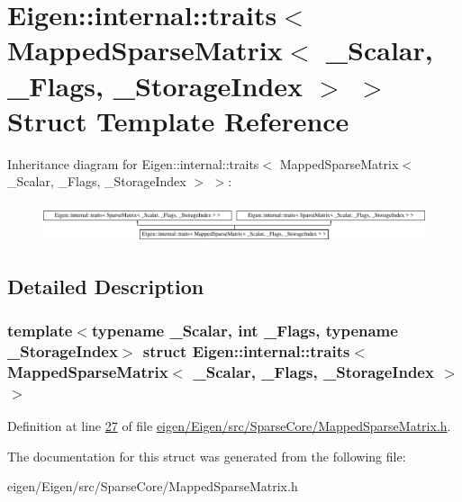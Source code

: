 \hypertarget{struct_eigen_1_1internal_1_1traits_3_01_mapped_sparse_matrix_3_01___scalar_00_01___flags_00_01___storage_index_01_4_01_4}{}\section{Eigen\+:\+:internal\+:\+:traits$<$ Mapped\+Sparse\+Matrix$<$ \+\_\+\+Scalar, \+\_\+\+Flags, \+\_\+\+Storage\+Index $>$ $>$ Struct Template Reference}
\label{struct_eigen_1_1internal_1_1traits_3_01_mapped_sparse_matrix_3_01___scalar_00_01___flags_00_01___storage_index_01_4_01_4}
Inheritance diagram for Eigen\+:\+:internal\+:\+:traits$<$ Mapped\+Sparse\+Matrix$<$ \+\_\+\+Scalar, \+\_\+\+Flags, \+\_\+\+Storage\+Index $>$ $>$\+:\begin{figure}[H]
\begin{center}
\leavevmode
\includegraphics[height=1.159420cm]{struct_eigen_1_1internal_1_1traits_3_01_mapped_sparse_matrix_3_01___scalar_00_01___flags_00_01___storage_index_01_4_01_4}
\end{center}
\end{figure}


\subsection{Detailed Description}
\subsubsection*{template$<$typename \+\_\+\+Scalar, int \+\_\+\+Flags, typename \+\_\+\+Storage\+Index$>$\newline
struct Eigen\+::internal\+::traits$<$ Mapped\+Sparse\+Matrix$<$ \+\_\+\+Scalar, \+\_\+\+Flags, \+\_\+\+Storage\+Index $>$ $>$}



Definition at line \hyperlink{eigen_2_eigen_2src_2_sparse_core_2_mapped_sparse_matrix_8h_source_l00027}{27} of file \hyperlink{eigen_2_eigen_2src_2_sparse_core_2_mapped_sparse_matrix_8h_source}{eigen/\+Eigen/src/\+Sparse\+Core/\+Mapped\+Sparse\+Matrix.\+h}.



The documentation for this struct was generated from the following file\+:\begin{DoxyCompactItemize}
\item 
eigen/\+Eigen/src/\+Sparse\+Core/\+Mapped\+Sparse\+Matrix.\+h\end{DoxyCompactItemize}
